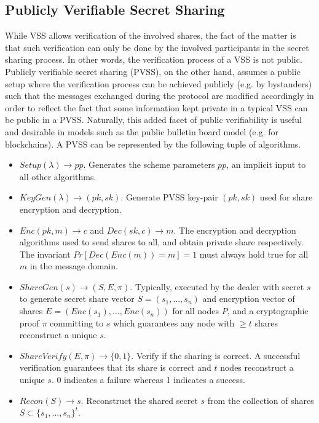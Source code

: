 \documentclass[letterpaper,twocolumn,10pt]{article}
\theoremstyle{definition}
\theoremstyle{remark}
\begin{document}
\subsection{Publicly Verifiable Secret Sharing}
While VSS allows verification of the involved shares, the fact of the matter is that such verification can only be done by the involved participants in the secret sharing process. In other words, the verification process of a VSS is not public. Publicly verifiable secret sharing (PVSS), on the other hand, assumes a public setup where the verification process can be achieved publicly (e.g. by bystanders) such that the messages exchanged during the protocol are modified accordingly in order to reflect the fact that some information kept private in a typical VSS can be public in a PVSS. Naturally, this added facet of public verifiability is useful and desirable in models such as the public bulletin board model (e.g. for blockchains). A PVSS can be represented by the following tuple of algorithms.
\begin{itemize}
\item $Setup(\lambda) \rightarrow pp$. Generates the scheme parameters $pp$, an implicit input to all other algorithms.
\item $KeyGen(\lambda) \rightarrow (pk, sk)$. Generate PVSS key-pair $(pk, sk)$ used for share encryption and decryption.
\item $Enc(pk, m) \rightarrow c$ and $Dec(sk, c) \rightarrow m$. The encryption and decryption algorithms used to send shares to all, and obtain private share respectively. The invariant $Pr[Dec(Enc(m)) = m] = 1$ must always hold true for all $m$ in the message domain.
\item $ShareGen(s) \rightarrow (S, E, \pi)$. Typically, executed by the dealer with secret $s$ to generate secret share vector $S = (s_1, ..., s_n)$ and encryption vector of shares $E = (Enc(s_1), ..., Enc(s_n))$ for all nodes $P$, and a cryptographic proof $\pi$ committing to $s$ which guarantees any node with $\geq t$ shares reconstruct a unique $s$.
\item $ShareVerify(E, \pi) \rightarrow \{0, 1\}$. Verify if the sharing is correct. A successful verification guarantees that its share is correct and $t$ nodes reconstruct a unique $s$. 0 indicates a failure whereas 1 indicates a success.
\item $Recon(S) \rightarrow s$. Reconstruct the shared secret $s$ from the collection of shares $S \subset \{s_1, ..., s_n\}^{t}$.
\end{itemize}
\end{document}
